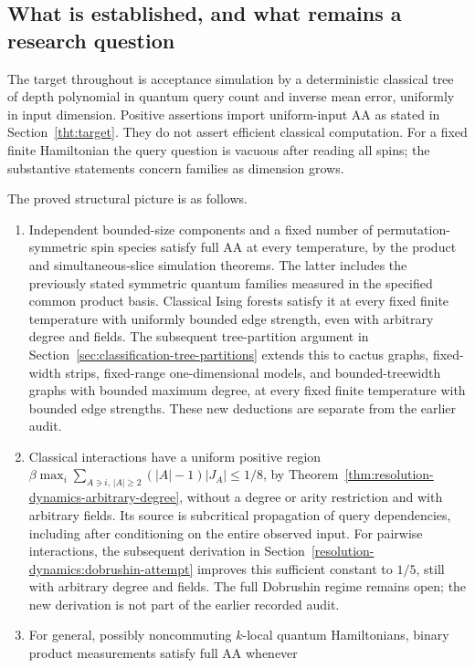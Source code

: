 \subsection{What is established, and what remains a research question}
\label{sec:resolution-status}

The target throughout is acceptance simulation by a deterministic
classical tree of depth polynomial in quantum query count and inverse
mean error, uniformly in input dimension. Positive assertions import
uniform-input AA as stated in Section~\ref{tht:target}. They do not
assert efficient classical computation. For a fixed finite Hamiltonian
the query question is vacuous after reading all spins; the substantive
statements concern families as dimension grows.

The proved structural picture is as follows.
\begin{enumerate}
\item Independent bounded-size components and a fixed number of
permutation-symmetric spin species satisfy full AA at every
temperature, by the product and simultaneous-slice simulation
theorems. The latter includes the previously stated symmetric quantum
families measured in the specified common product basis. Classical
Ising forests satisfy it at every fixed finite temperature with
uniformly bounded edge strength, even with arbitrary degree and fields.
The subsequent tree-partition argument in
Section~\ref{sec:classification-tree-partitions} extends this to
cactus graphs, fixed-width strips, fixed-range one-dimensional
models, and bounded-treewidth graphs with bounded maximum degree,
at every fixed finite temperature with bounded edge strengths.
These new deductions are separate from the earlier audit.
\item Classical interactions have a uniform positive region
$\beta\max_i\sum_{A\ni i,\,|A|\ge2}(|A|-1)|J_A|\le1/8$,
by Theorem~\ref{thm:resolution-dynamics-arbitrary-degree}, without
a degree or arity restriction and with arbitrary fields. Its source is
subcritical propagation of query dependencies, including after
conditioning on the entire observed input.
For pairwise interactions, the subsequent derivation in
Section~\ref{resolution-dynamics:dobrushin-attempt} improves this
sufficient constant to $1/5$, still with arbitrary degree and fields.
The full Dobrushin regime remains open; the new derivation is not
part of the earlier recorded audit.
\item For general, possibly noncommuting $k$-local quantum Hamiltonians,
binary product measurements satisfy full AA whenever

\end{enumerate}
